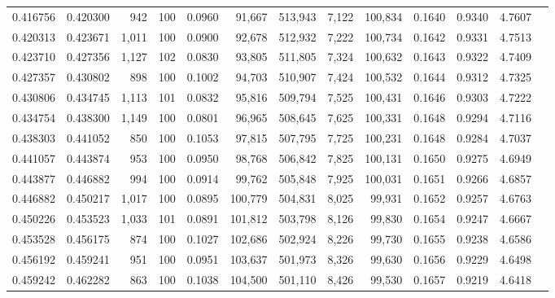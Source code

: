 \begin{tabular}{rrrrrrrrrrrrr}
0.416756 & 0.420300 &   942 & 100 &                                     0.0960 &  91,667 & 513,943 &   7,122 & 100,834 & 0.1640 & 0.9340 & 4.7607 \\
0.420313 & 0.423671 & 1,011 & 100 &                                     0.0900 &  92,678 & 512,932 &   7,222 & 100,734 & 0.1642 & 0.9331 & 4.7513 \\
0.423710 & 0.427356 & 1,127 & 102 &                                     0.0830 &  93,805 & 511,805 &   7,324 & 100,632 & 0.1643 & 0.9322 & 4.7409 \\
0.427357 & 0.430802 &   898 & 100 &                                     0.1002 &  94,703 & 510,907 &   7,424 & 100,532 & 0.1644 & 0.9312 & 4.7325 \\
0.430806 & 0.434745 & 1,113 & 101 &                                     0.0832 &  95,816 & 509,794 &   7,525 & 100,431 & 0.1646 & 0.9303 & 4.7222 \\
0.434754 & 0.438300 & 1,149 & 100 &                                     0.0801 &  96,965 & 508,645 &   7,625 & 100,331 & 0.1648 & 0.9294 & 4.7116 \\
0.438303 & 0.441052 &   850 & 100 &                                     0.1053 &  97,815 & 507,795 &   7,725 & 100,231 & 0.1648 & 0.9284 & 4.7037 \\
0.441057 & 0.443874 &   953 & 100 &                                     0.0950 &  98,768 & 506,842 &   7,825 & 100,131 & 0.1650 & 0.9275 & 4.6949 \\
0.443877 & 0.446882 &   994 & 100 &                                     0.0914 &  99,762 & 505,848 &   7,925 & 100,031 & 0.1651 & 0.9266 & 4.6857 \\
0.446882 & 0.450217 & 1,017 & 100 &                                     0.0895 & 100,779 & 504,831 &   8,025 &  99,931 & 0.1652 & 0.9257 & 4.6763 \\
0.450226 & 0.453523 & 1,033 & 101 &                                     0.0891 & 101,812 & 503,798 &   8,126 &  99,830 & 0.1654 & 0.9247 & 4.6667 \\
0.453528 & 0.456175 &   874 & 100 &                                     0.1027 & 102,686 & 502,924 &   8,226 &  99,730 & 0.1655 & 0.9238 & 4.6586 \\
0.456192 & 0.459241 &   951 & 100 &                                     0.0951 & 103,637 & 501,973 &   8,326 &  99,630 & 0.1656 & 0.9229 & 4.6498 \\
0.459242 & 0.462282 &   863 & 100 &                                     0.1038 & 104,500 & 501,110 &   8,426 &  99,530 & 0.1657 & 0.9219 & 4.6418 \\

\end{tabular}
